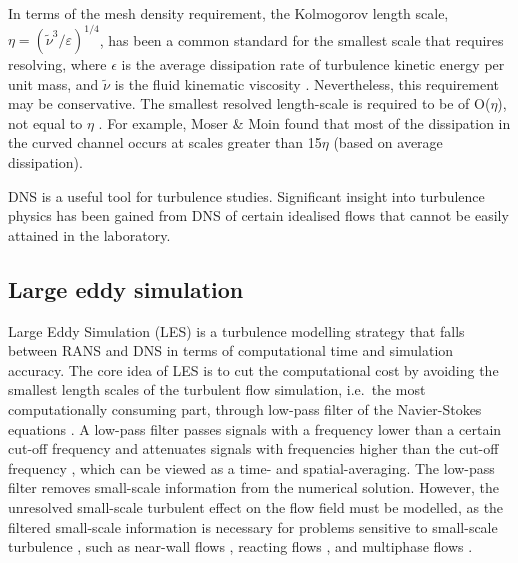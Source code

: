 In terms of the mesh density requirement, the Kolmogorov length scale, $ \eta = (\widetilde{\nu}^3/\varepsilon)^{1/4} $, has been a common standard for the smallest scale that requires resolving, where $ \epsilon $ is the average dissipation rate of turbulence kinetic energy per unit mass, and $ \widetilde{\nu} $ is the fluid kinematic viscosity \cite{Landahl1992}. Nevertheless, this requirement may be conservative. The smallest resolved length-scale is required to be of O($ \eta $), not equal to $ \eta $ \cite{Moin1998}. For example, Moser \& Moin \cite{Moser1987} found that most of the dissipation in the curved channel occurs at scales greater than 15$ \eta $ (based on average dissipation).

%


DNS is a useful tool for turbulence studies. Significant insight into turbulence physics has been gained from DNS of certain idealised flows that cannot be easily attained in the laboratory. \cite{Moin1998}

\subsection{Large eddy simulation}

Large Eddy Simulation (LES) is a turbulence modelling strategy that falls between RANS and DNS in terms of computational time and simulation accuracy. The core idea of LES is to cut the computational cost by avoiding the smallest length scales of the turbulent flow simulation, i.e.\ the most computationally consuming part, through low-pass filter of the Navier-Stokes equations \cite{largeeddysimulation2015}. A low-pass filter passes signals with a frequency lower than a certain cut-off frequency and attenuates signals with frequencies higher than the cut-off frequency \cite{wikiLowpass}, which can be viewed as a time- and spatial-averaging. The low-pass filter removes small-scale information from the numerical solution. However, the unresolved small-scale turbulent effect on the flow field must be modelled, as the filtered small-scale information is necessary for problems sensitive to small-scale turbulence \cite{largeeddysimulation2015}, such as near-wall flows \cite{Balaras2002,Spalart2009}, reacting flows \cite{Pitsch2006}, and multiphase flows \cite{Fox2012}.

